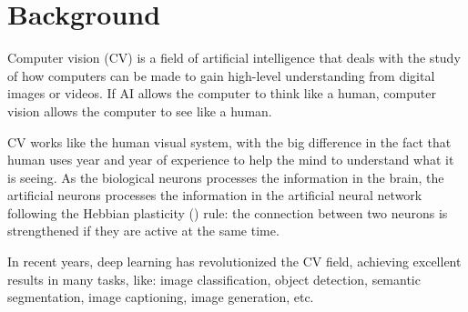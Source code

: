 \section{Background}\label{sec:background}
Computer vision (CV) is a field of artificial intelligence that deals with the study of how computers can be made to gain high-level understanding from digital images or videos.
If AI allows the computer to think like a human, computer vision allows the computer to see like a human.

CV works like the human visual system, with the big difference in the fact that human uses year and year of experience to help the mind to understand what it is seeing.
As the biological neurons processes the information in the brain, the artificial neurons processes the information in the artificial neural network following the Hebbian plasticity (\cite{site:hebbian-plasticity}) rule: the connection between two neurons is strengthened if they are active at the same time.

In recent years, deep learning has revolutionized the CV field, achieving excellent results in many tasks, like: image classification, object detection, semantic segmentation, image captioning, image generation, etc.

